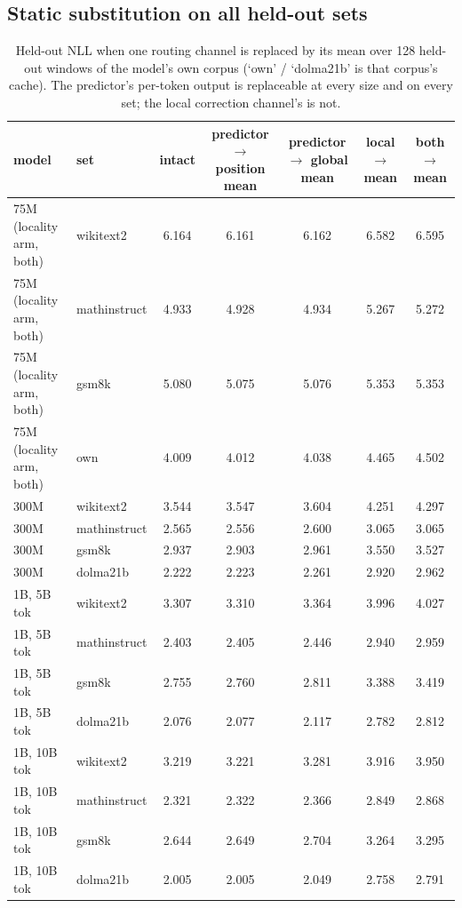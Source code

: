 \subsection{Static substitution on all held-out sets}
\label{app:static}
\begin{table}[h]\centering\scriptsize\setlength{\tabcolsep}{3pt}
\begin{tabular}{llccccc}\toprule
model & set & intact & predictor $\to$ position mean & predictor $\to$ global mean & local $\to$ mean & both $\to$ mean \\\midrule
75M (locality arm, both) & wikitext2 & 6.164 & 6.161 & 6.162 & 6.582 & 6.595 \\
75M (locality arm, both) & mathinstruct & 4.933 & 4.928 & 4.934 & 5.267 & 5.272 \\
75M (locality arm, both) & gsm8k & 5.080 & 5.075 & 5.076 & 5.353 & 5.353 \\
75M (locality arm, both) & own & 4.009 & 4.012 & 4.038 & 4.465 & 4.502 \\
300M & wikitext2 & 3.544 & 3.547 & 3.604 & 4.251 & 4.297 \\
300M & mathinstruct & 2.565 & 2.556 & 2.600 & 3.065 & 3.065 \\
300M & gsm8k & 2.937 & 2.903 & 2.961 & 3.550 & 3.527 \\
300M & dolma21b & 2.222 & 2.223 & 2.261 & 2.920 & 2.962 \\
1B, 5B tok & wikitext2 & 3.307 & 3.310 & 3.364 & 3.996 & 4.027 \\
1B, 5B tok & mathinstruct & 2.403 & 2.405 & 2.446 & 2.940 & 2.959 \\
1B, 5B tok & gsm8k & 2.755 & 2.760 & 2.811 & 3.388 & 3.419 \\
1B, 5B tok & dolma21b & 2.076 & 2.077 & 2.117 & 2.782 & 2.812 \\
1B, 10B tok & wikitext2 & 3.219 & 3.221 & 3.281 & 3.916 & 3.950 \\
1B, 10B tok & mathinstruct & 2.321 & 2.322 & 2.366 & 2.849 & 2.868 \\
1B, 10B tok & gsm8k & 2.644 & 2.649 & 2.704 & 3.264 & 3.295 \\
1B, 10B tok & dolma21b & 2.005 & 2.005 & 2.049 & 2.758 & 2.791 \\
\bottomrule\end{tabular}
\caption{Held-out NLL when one routing channel is replaced by its mean over 128 held-out windows of the model's own corpus (`own' / `dolma21b' is that corpus's cache). The predictor's per-token output is replaceable at every size and on every set; the local correction channel's is not.}
\label{tab:static_all}\end{table}

